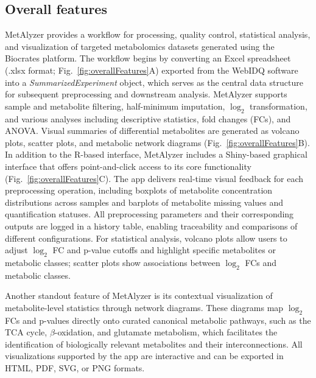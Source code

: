 \documentclass[12pt, a4paper]{article}
\begin{document}
\subsection*{\normalsize Overall features}
MetAlyzer provides a workflow for processing, quality control, statistical analysis, and visualization of targeted metabolomics datasets generated using the Biocrates platform. The workflow begins by converting an Excel spreadsheet (.xlsx format; Fig.~\ref{fig:overallFeatures}A) exported from the WebIDQ software into a \textit{SummarizedExperiment} object\cite{Morgan2022}, which serves as the central data structure for subsequent preprocessing and downstream analysis. MetAlyzer supports sample and metabolite filtering, half-minimum imputation, $\log_2$ transformation, and various analyses including descriptive statistics, fold changes (FCs), and ANOVA. Visual summaries of differential metabolites are generated as volcano plots, scatter plots, and metabolic network diagrams (Fig.~\ref{fig:overallFeatures}B). In addition to the R-based interface, MetAlyzer includes a Shiny-based graphical interface\cite{Chang2024} that offers point-and-click access to its core functionality (Fig.~\ref{fig:overallFeatures}C). The app delivers real-time visual feedback for each preprocessing operation, including boxplots of metabolite concentration distributions across samples and barplots of metabolite missing values and quantification statuses. All preprocessing parameters and their corresponding outputs are logged in a history table, enabling traceability and comparisons of different configurations. For statistical analysis, volcano plots allow users to adjust $\log_2$ FC and p-value cutoffs and highlight specific metabolites or metabolic classes; scatter plots show associations between $\log_2$ FCs and metabolic classes.

Another standout feature of MetAlyzer is its contextual visualization of metabolite-level statistics through network diagrams. These diagrams map $\log_2$ FCs and p-values directly onto curated canonical metabolic pathways, such as the TCA cycle, $\beta$-oxidation, and glutamate metabolism, which facilitates the identification of biologically relevant metabolites and their interconnections. All visualizations supported by the app are interactive and can be exported in HTML, PDF, SVG, or PNG formats.
\end{document}
